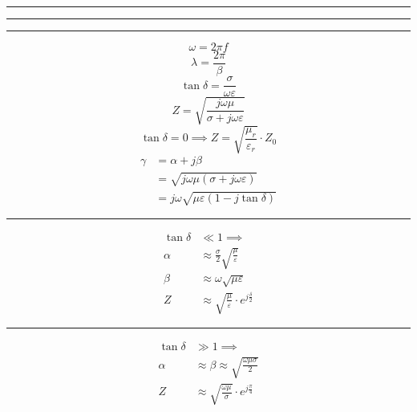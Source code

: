 \documentclass[12pt]{article}
\newcommand{\grayrule}{{\color{lightgray} \hrule}}
\begin{document}
\begin{multicols}{3}
\grayrule {\color{darkgray}\hrule} \grayrule

\begin{equation*}
    \omega = 2 \pi f
\end{equation*}
\begin{equation*}
    \lambda = \frac{2 \pi}{\beta}
\end{equation*}
\begin{equation*}
    \tan \delta = \frac{\sigma}{\omega \varepsilon}
\end{equation*}
\begin{equation*}
    Z = \sqrt{\frac{j \omega \mu}{\sigma + j \omega \varepsilon}}
\end{equation*}
\begin{equation*}
    \tan \delta = 0 \implies Z = \sqrt{\frac{\mu_r}{\varepsilon_r}} \cdot Z_0
\end{equation*}
\begin{equation*}
    \begin{split}
        \gamma &= \alpha + j \beta \\
               &= \sqrt{j \omega \mu (\sigma + j \omega \varepsilon)} \\
               &= j \omega \sqrt{\mu \varepsilon (1 - j \tan \delta)}
    \end{split}
\end{equation*}

\grayrule

\begin{equation*}
    \begin{split}
        \tan \delta &\ll 1 \implies \\
        \alpha &\approx \frac{\sigma}{2} \sqrt{\frac{\mu}{\varepsilon}} \\
        \beta &\approx \omega \sqrt{\mu \varepsilon} \\
        Z &\approx \sqrt{\frac{\mu}{\varepsilon}} \cdot e^{j \frac{\delta}{2}}
    \end{split}
\end{equation*}
\grayrule
\begin{equation*}
    \begin{split}
        \tan \delta &\gg 1 \implies \\
        \alpha &\approx \beta \approx \sqrt{\frac{\omega \mu \sigma}{2}} \\
        Z &\approx \sqrt{\frac{\omega \mu}{\sigma}} \cdot e^{j \frac{\pi}{4}}
    \end{split}
\end{equation*}

\end{multicols}
\end{document}
